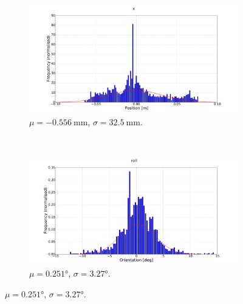 \begin{figure}
  \begin{subfigure}{0.48\textwidth}
    \includegraphics[clip, trim = 120 0 120 0, width=\textwidth]{figures/chapter3/norm_x}
    \caption{$\mu = \SI{-0.556}{\mm}$, $\sigma = \SI{32.5}{\mm}$.}
  \end{subfigure}
~
  \begin{subfigure}{0.48\textwidth}
     \includegraphics[clip, trim = 120 0 120 0, width=\textwidth]{figures/chapter3/norm_roll}
     \caption{$\mu = \ang{0.251}$, $\sigma = \ang{3.27}$.}
  \label{fig:norm-roll}
  \end{subfigure}


\end{figure}
